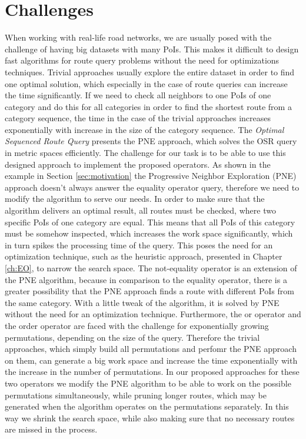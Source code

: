 \section{Challenges}
When working with real-life road networks, we are usually posed with the challenge of having big datasets with many PoIs. This makes it difficult to design fast algorithms for route query problems without the need for optimizations techniques. Trivial approaches usually explore the entire dataset in order to find one optimal solution, which especially in the case of route queries can increase the time significantly. If we need to check all neighbors to one PoIs of one category and do this for all categories in order to find the shortest route from a category sequence, the time in the case of the trivial approaches increases exponentially with increase in the size of the category sequence. The \textit{Optimal Sequenced Route Query} \cite{OSR} presents the PNE approach, which solves the OSR query in metric spaces efficiently. The challenge for our task is to be able to use this designed approach to implement the proposed operators. \newline
As shown in the example in Section \ref{sec:motivation} the Progressive Neighbor Exploration (PNE) approach doesn't always answer the equality operator query, therefore we need to modify the algorithm to serve our needs. In order to make sure that the algorithm delivers an optimal result, all routes must be checked, where two specific PoIs of one category are equal. This means that all PoIs of this category must be somehow inspected, which increases the work space significantly, which in turn spikes the processing time of the query. This poses the need for an optimization technique, such as the heuristic approach, presented in Chapter \ref{ch:EO}, to narrow the search space. \newline
The not-equality operator is an extension of the PNE algorithm, because in comparison to the equality operator, there is a greater possibility that the PNE approach finds a route with different PoIs from the same category. With a little tweak of the algorithm, it is solved by PNE without the need for an optimization technique.\newline
Furthermore, the or operator and the order operator are faced with the challenge for exponentially growing permutations, depending on the size of the query. Therefore the trivial approaches, which simply build all permutations and perfomr the PNE approach on them, can generate a big work space and increase the time exponentially with the increase in the number of permutations. In our proposed approaches for these two operators we modify the PNE algorithm to be able to work on the possible permutations simultaneously, while pruning longer routes, which may be generated when the algorithm operates on the  permutations separately. In this way we shrink the search space, while also making sure that no necessary routes are missed in the process.

